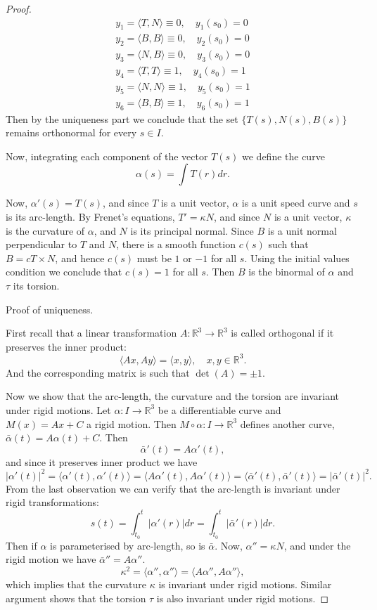 \documentclass{amsart}
\begin{document}
\begin{proof}
\begin{equation}
\begin{split}
y_1 = \langle T, N \rangle \equiv 0, \quad y_1 (s_0)= 0\\
y_2 = \langle B, B \rangle \equiv 0, \quad y_2 (s_0)= 0 \\
y_3 = \langle N, B \rangle \equiv 0, \quad y_3 (s_0)= 0 \\
y_4 = \langle T, T \rangle \equiv 1, \quad y_4 (s_0)= 1 \\
y_5 = \langle N, N \rangle \equiv 1, \quad y_5 (s_0)= 1 \\
y_6 = \langle B, B \rangle \equiv 1, \quad y_6 (s_0)= 1 
\end{split}
\end{equation}
Then by the uniqueness part we conclude that the set \(\{ T(s), N(s), B(s) \}\) remains orthonormal for every \(s\in I\).

Now, integrating each component of the vector \(T(s)\) we define the curve 
\[
\alpha(s) = \int T(r) dr. \]

Now, \(\alpha'(s) = T(s)\), and since \(T\) is a unit vector, \(\alpha\) is a unit speed curve and \(s\) is its arc-length. By Frenet's equations, \(T' = \kappa N\), and since \(N\) is a unit vector, \(\kappa\) is the curvature of \(\alpha\), and 
\(N\) is its principal normal. Since \(B\) is a unit normal perpendicular to \(T\) and \(N\), there is a smooth function  \(c(s)\) such that \(B = c T\times N\), and hence \(c(s)\) must be \(1\) or \(-1\) for all \(s\). Using the initial values condition we conclude that \(c(s) = 1\) for all \(s\). Then \(B\) is the binormal of \(\alpha\) and \(\tau\) its torsion.

Proof of uniqueness.

First recall that a linear transformation \(A: \mathbb{R}^3 \to \mathbb{R}^3\) is called orthogonal if it preserves the inner product:
\[ \langle Ax, Ay \rangle = \langle x, y \rangle,\quad x,y\in\mathbb{R}^3. \]
And the corresponding matrix is such that \(\det(A) = \pm 1\).

Now we show that the arc-length, the curvature and the torsion are invariant under rigid motions.
Let \(\alpha:I\to\mathbb{R}^3\) be a differentiable curve and \(M(x) = Ax + C\) a rigid motion. Then \(M \circ \alpha : I \to \mathbb{R}^3\) defines another curve, \(\bar{\alpha} (t) = A\alpha(t) + C\). Then
\[ \bar{\alpha}'(t) = A\alpha'(t), \]
and since it preserves inner product we have
\[ |\alpha'(t)|^2  = \langle \alpha'(t), \alpha'(t) \rangle = \langle A\alpha'(t), A\alpha'(t)\rangle = \langle \bar{\alpha}'(t) , \bar{\alpha}'(t) \rangle = |\bar{\alpha}'(t)|^2. \]
From the last observation we can verify that the arc-length is invariant under rigid transformations:
\[ s(t) = \int_{t_0}^{t} |\alpha'(r)| dr = \int_{t_0}^{t} |\bar{\alpha}'(r)| dr. \]
Then if \(\alpha\) is parameterised by arc-length, so is \(\bar{\alpha}\). Now, \(\alpha'' = \kappa N\), and under the rigid motion we have \(\bar{\alpha}'' = A\alpha''\). 
\[ \kappa^2 = \langle \alpha'',\alpha''\rangle = \langle A\alpha'',A\alpha''\rangle, \]
which implies that the curvature \(\kappa\) is
invariant under rigid motions. Similar argument shows that the torsion \(\tau\) is also invariant under rigid motions.


\end{proof}
\end{document}
